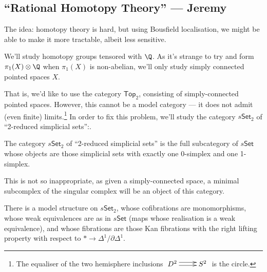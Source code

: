 \documentclass[11pt]{article}
\newcommand{\KanSemResponse}[1]
{
\thispagestyle{fancy}
\section{#1}
}
\begin{document}
\begin{Jeremy RationalHomotopyPractice}
\KanSemResponse
{``Rational Homotopy Theory'' --- Jeremy}
The idea: homotopy theory is hard, but using Bousfield localisation, we might be able to make it more tractable, albeit less sensitive.

We'll study homotopy groups tensored with $\Q$. As it's strange to try and form $\pi_1(X)\otimes\Q$ when $\pi_1(X)$ is non-abelian, we'll only study simply connected pointed spaces $X$.

That is, we'd like to use the category $\mathsf{Top}_2$, consisting of simply-connected pointed spaces. However, this cannot be a model category --- it does not admit (even finite) limits.\footnote{The equaliser of the two hemisphere inclusions $\xymatrix{D^2\ar@<1mm>[r] \ar@<-.5mm>[r]&S^2}$ is the circle.}
In order to fix this problem, we'll study the category $s\mathsf{Set}_2$ of ``2-reduced simplicial sets'':. 
\begin{defn*}
The category $s\mathsf{Set}_2$ of ``2-reduced simplicial sets'' is the full subcategory of $s\mathsf{Set}$ whose objects are those simplicial sets with exactly one 0-simplex and one 1-simplex.
\end{defn*}
\noindent This is not so inappropriate, as given a simply-connected space, a minimal subcomplex of the singular complex will be an object of this category.
\begin{prop*}
There is a model structure on $s\mathsf{Set}_2$, whose cofibrations are monomorphisms, whose weak equivalences are as in $s\mathsf{Set}$ (maps whose realisation is a weak equivalence), and whose fibrations are those Kan fibrations with the right lifting property with respect to $*\to\Delta^1/\partial\Delta^1$. 
\end{prop*}

\end{Jeremy RationalHomotopyPractice}
\end{document}
